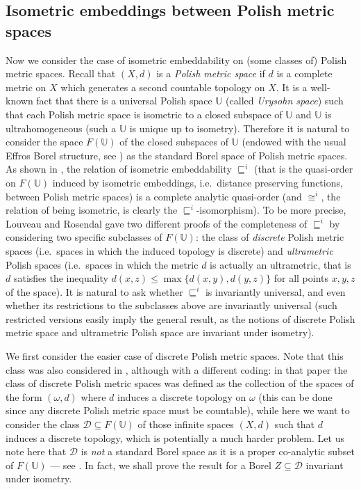 \documentclass{amsart}
\theoremstyle{definition}
\theoremstyle{remark}
\begin{document}
\subsection{Isometric embeddings between Polish metric spaces}\label{metric}

Now we consider the case of isometric embeddability on (some classes
of) Polish metric spaces. Recall that $(X,d)$ is a \emph{Polish metric space}
if $d$ is a complete metric on $X$ which generates a second countable
topology on $X$. It is a well-known fact that there is a universal
Polish space  $\mathbb{U}$ (called \emph{Urysohn space}) such that each
Polish metric space is isometric to a closed subspace of $\mathbb{U}$
and $\mathbb{U}$ is ultrahomogeneous
(such a $\mathbb{U}$ is unique up to isometry). Therefore it is
natural to consider the space $F(\mathbb{U})$ of the closed subspaces
of $\mathbb{U}$ (endowed with the usual Effros Borel structure, see \cite[\S 12.C]{Kechris1995}) as the
standard Borel space of Polish metric spaces. As shown in \cite{louros}, the relation of isometric embeddability $\sqsubseteq^i$ (that is the
quasi-order on $F(\mathbb{U})$ induced by isometric embeddings, i.e.\ distance preserving functions, between
Polish metric spaces)
is a complete analytic quasi-order (and $\cong^i$, the relation of
being isometric, is clearly the $\sqsubseteq^i$-isomorphism). To be
more precise, Louveau and Rosendal
gave two different proofs of the completeness of $\sqsubseteq^i$ by
considering two specific subclasses of $F(\mathbb{U})$: the class of
\emph{discrete} Polish metric spaces (i.e.\ spaces in which the induced
topology is discrete) and \emph{ultrametric} Polish spaces (i.e.\
spaces in which the metric $d$ is actually an ultrametric, that is $d$
satisfies the inequality $d(x,z) \leq \max \{ d(x,y),d(y,z) \}$ for all
points $x,y,z$ of the space).  It is natural to ask whether $\sqsubseteq^i$ is
invariantly universal, and even whether its restrictions to the subclasses
above are invariantly universal (such restricted versions easily imply
the general result, as the notions of discrete Polish metric space and
ultrametric Polish space are invariant under isometry).

We first consider the easier case of discrete Polish metric
spaces. Note that this class was also considered in
\cite{FriMot}, although with a different coding: in that paper the
class of discrete Polish metric spaces was defined as the collection
of the spaces of the form $(\omega,d)$ where $d$ induces a discrete
topology on $\omega$ (this can be done since any discrete Polish metric space must
be countable), while here we want to consider the class $\mathcal{D}
\subseteq F(\mathbb{U})$ of those infinite spaces $(X,d)$ such that $d$ induces a
discrete topology, which is potentially a much harder problem.
Let
  us note here that $\mathcal{D}$ is \emph{not} a standard Borel space
  as it is a proper co-analytic subset of $F(\mathbb{U})$ --- see
  \cite[Exercise 27.8]{Kechris1995}. In fact, we shall prove the result for a Borel $Z\subseteq \mathcal D $ invariant under isometry.
\end{document}
